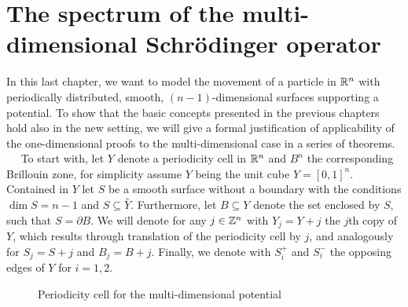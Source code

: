 \chapter{The spectrum of the multi-dimensional Schrödinger operator}  \label{chap:7} %

In this last chapter, we want to model the movement of a particle in $\mathbb{R}^{n}$ with periodically distributed, smooth, $(n-1)$-dimensional surfaces supporting a potential. To show that the basic concepts presented in the previous chapters hold also in the new setting, we will give a formal justification of applicability of the one-dimensional proofs to the multi-dimensional case in a series of theorems.
~\newline ~\newline
To start with, let $Y$ denote a periodicity cell in $\mathbb{R}^{n}$ and $B^{n}$ the corresponding Brillouin zone, for simplicity assume $Y$ being the unit cube $Y = [0, 1]^{n}$. Contained in $Y$ let $S$ be a smooth surface without a boundary with the conditions $\dim S = n - 1$ and $S \subseteq \overset{\circ}{Y}$. Furthermore, let $B \subseteq Y$ denote the set enclosed by $S$, such that $S = \partial B$. We will denote for any $j \in \mathbb{Z}^{n}$ with $Y_{j} = Y + j$ the $j$th copy of $Y$, which results through translation of the periodicity cell by $j$, and analogously for $S_{j} = S + j$ and $B_{j} = B + j$. Finally, we denote with $S_{i}^{+}$ and $S_{i}^{-}$ the opposing edges of $Y$ for $i = 1, 2$.

\begin{figure}[!ht] \centering
	\caption{Periodicity cell for the multi-dimensional potential}
\end{figure}

